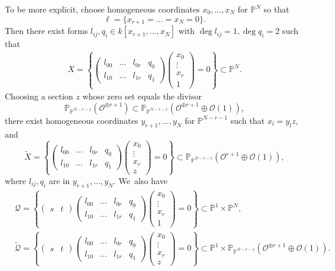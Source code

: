 \documentclass[10pt,a4paper]{amsart}
\theoremstyle{plain}
\theoremstyle{definition}
\renewcommand\P{\mathbb{P}}
\renewcommand\O{\mathcal{O}}
\begin{document}
To be more explicit, choose homogeneous coordinates $x_0,\dots, x_{N}$ for $\P^{N}$ so that
\[
\ell=\bigl\{x_{r+1}=\dots= x_{N}=0\bigr\}.
\]
Then there exist forms $l_{ij}, q_i\in k[x_{r+1}, \dots, x_{N}]$ with $\deg l_{ij}=1, \deg q_i =2$ such that
\begin{align*}
X
=\left\{
\begin{pmatrix}
l_{00} & \dots &l_{0r} & q_0\\
l_{10} & \dots & l_{1r} & q_1
\end{pmatrix}
\begin{pmatrix}
x_0\\[-3pt]
\vdots\\[-3pt]
x_r\\
1
\end{pmatrix}
=0
\right\}
\subset \P^{N}.
\end{align*}
Choosing a section $z$ whose zero set equals the divisor
\[
\P_{\P^{N-r-1}}(\O^{\oplus r+1})\subset \P_{\P^{N-r-1}}(\O^{\oplus r+1 }\oplus \O(1)),
\]
there exist homogeneous coordinates $y_{r+1},\dots, y_{N}$ for $\P^{N-r-1}$ such that $x_l = y_l z$,
and
\[
\widetilde{X}=
\left\{
\begin{pmatrix}
l_{00} & \dots &l_{0r} & q_0\\
l_{10} & \dots & l_{1r} & q_1
\end{pmatrix}
\begin{pmatrix}
x_0\\[-3pt]
\vdots\\[-3pt]
x_r\\
z
\end{pmatrix}
=0
\right\}\subset \P_{\P^{N-r-1}}(\O^{r+1}\oplus \O(1)),
\]
where $l_{ij}, q_i$ are in $y_{r+1},\dots, y_{N}$. We~also have
\begin{align*}
&\mathcal{Q}
=\left\{
\begin{pmatrix}
s & t
\end{pmatrix}
\begin{pmatrix}
l_{00} & \dots &l_{0r} & q_0\\
l_{10} & \dots & l_{1r} & q_1
\end{pmatrix}
\begin{pmatrix}
x_0\\[-3pt]
\vdots\\[-3pt]
x_r\\
1
\end{pmatrix}
=0
\right\}
\subset \P^1\times \P^{N},\\
&\widetilde{\mathcal{Q}}=
\left\{
\begin{pmatrix}
s & t
\end{pmatrix}
\begin{pmatrix}
l_{00} & \dots &l_{0r} & q_0\\
l_{10} & \dots & l_{1r} & q_1
\end{pmatrix}
\begin{pmatrix}
x_0\\[-3pt]
\vdots\\[-3pt]
x_r\\
z
\end{pmatrix}
=0
\right\}\subset \P^1\times \P_{\P^{N-r-1}}(\O^{\oplus r+1}\oplus \O(1)).
\end{align*}
\end{document}
